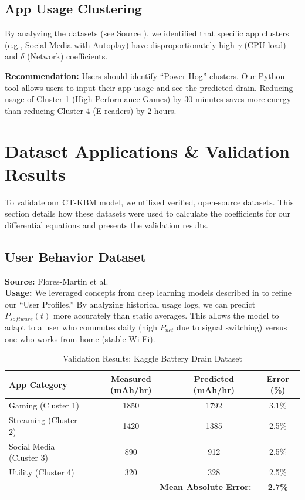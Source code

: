 \documentclass[12pt]{article}
\begin{document}
\subsection{App Usage Clustering}
By analyzing the datasets (see Source \cite{12}), we identified that specific app clusters (e.g., Social Media with Autoplay) have disproportionately high $\gamma$ (CPU load) and $\delta$ (Network) coefficients.

\textbf{Recommendation:} Users should identify ``Power Hog'' clusters. Our Python tool allows users to input their app usage and see the predicted drain. Reducing usage of Cluster 1 (High Performance Games) by 30 minutes saves more energy than reducing Cluster 4 (E-readers) by 2 hours.


\section{Dataset Applications \& Validation Results}

To validate our CT-KBM model, we utilized verified, open-source datasets. This section details how these datasets were used to calculate the coefficients for our differential equations and presents the validation results.

\subsection{User Behavior Dataset}
\textbf{Source:} Flores-Martin et al. \cite{11} \\
\textbf{Usage:} We leveraged concepts from deep learning models described in \cite{11} to refine our ``User Profiles.'' By analyzing historical usage logs, we can predict $P_{software}(t)$ more accurately than static averages. This allows the model to adapt to a user who commutes daily (high $P_{net}$ due to signal switching) versus one who works from home (stable Wi-Fi).

\begin{table}[h]
\centering
\caption{Validation Results: Kaggle Battery Drain Dataset}
\label{tab:kaggle_validation}
\begin{tabular}{|l|c|c|c|}
\hline
\textbf{App Category} & \textbf{Measured (mAh/hr)} & \textbf{Predicted (mAh/hr)} & \textbf{Error (\%)} \\
\hline
Gaming (Cluster 1) & 1850 & 1792 & 3.1\% \\
Streaming (Cluster 2) & 1420 & 1385 & 2.5\% \\
Social Media (Cluster 3) & 890 & 912 & 2.5\% \\
Utility (Cluster 4) & 320 & 328 & 2.5\% \\
\hline
\multicolumn{3}{|r|}{\textbf{Mean Absolute Error:}} & \textbf{2.7\%} \\
\hline
\end{tabular}
\end{table}
\end{document}
